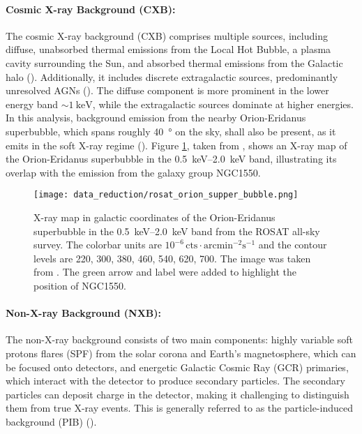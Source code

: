 \paragraph*{Cosmic X-ray Background (CXB):} The cosmic X-ray background (CXB) comprises multiple sources, including diffuse, unabsorbed thermal emissions from the Local Hot Bubble, a plasma cavity surrounding the Sun, and absorbed thermal emissions from the Galactic halo (\cite{galeazzi2006xmm}). Additionally, it includes discrete extragalactic sources, predominantly unresolved AGNs  (\cite{brandt2005deep}). The diffuse component is more prominent in the lower energy band \(\sim\SI{1}{\kilo\electronvolt}\), while the extragalactic sources dominate at higher energies. In this analysis, background emission from the nearby Orion-Eridanus superbubble, which spans roughly \SI{40}{\degree} on the sky, shall also be present, as it emits in the soft X-ray regime (\cite{Krause_2014}). Figure \ref{fig:orion_superbubble}, taken from \citep{Krause_2014}, shows an X-ray map of the Orion-Eridanus superbubble in the \SIrange{0.5}{2.0}{\kilo\electronvolt} band, illustrating its overlap with the emission from the galaxy group NGC1550.
\begin{figure}[htbp]
    \centering
    \texttt{[image: data\_reduction/rosat\_orion\_supper\_bubble.png]}
    \caption{X-ray map in galactic coordinates of the Orion-Eridanus superbubble in the \SIrange{0.5}{2.0}{\kilo\electronvolt} band from the ROSAT all-sky survey. The colorbar units are \(10^{-6}\,\text{cts}\cdot\text{arcmin}^{-2}\text{s}^{-1}\) and the contour levels are 220, 300, 380,
    460, 540, 620, 700. The image was taken from \citep{Krause_2014}. The green arrow and label were added to highlight the position of NGC1550.}
    \label{fig:orion_superbubble}
\end{figure}
\paragraph*{Non-X-ray Background (NXB):} The non-X-ray background consists of two main components: highly variable soft protons flares (SPF) from the solar corona and Earth's magnetosphere, which can be focused onto detectors, and energetic Galactic Cosmic Ray (GCR) primaries, which interact with the detector to produce secondary particles. The secondary particles can deposit charge in the detector, making it challenging to distinguish them from true X-ray events. This is generally referred to as the particle-induced background (PIB) (\cite{Bulbul_2020}). 
